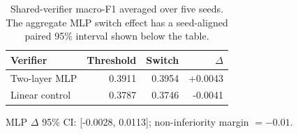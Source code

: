 \begin{table}[t]
\centering
\caption{Shared-verifier macro-F1 averaged over five seeds. The aggregate MLP switch effect has a seed-aligned paired 95\% interval shown below the table.}
\label{tab:publication-verifier}
\small
\begin{tabular}{lrrr}
\toprule
Verifier & Threshold & Switch & $\Delta$ \\
\midrule
Two-layer MLP & 0.3911 & 0.3954 & +0.0043 \\
Linear control & 0.3787 & 0.3746 & -0.0041 \\
\bottomrule
\end{tabular}
\vspace{1mm}\par\footnotesize MLP $\Delta$ 95\% CI: [-0.0028, 0.0113]; non-inferiority margin $=-0.01$.
\end{table}
